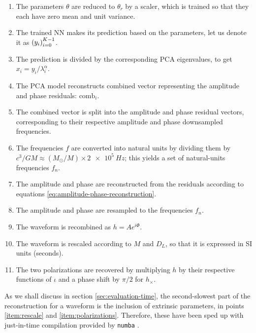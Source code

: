 \documentclass[main.tex]{subfiles}
\begin{document}
\begin{enumerate}
    \item The parameters \(\theta \) are reduced to \(\theta _r\) by a scaler, which is trained so that they each have zero mean and unit variance. \label{item:param-reduction}
    \item The trained \ac{NN} makes its prediction based on the parameters, let us denote it as \(\qty(y_i)_{i=0}^{K-1}\). \label{item:nn-prediction}
    \item The prediction is divided by the corresponding \ac{PCA} eigenvalues, to get \(x_i = y_i / \lambda _i^{\alpha }\).
    \item The \ac{PCA} model reconstructs combined vector representing the amplitude and phase residuals: \(\text{comb}_i\). \label{item:pca-reconstruction}
    \item The combined vector is split into the amplitude and phase residual vectors, corresponding to their respective amplitude and phase downsampled frequencies. \label{item:combined-split}
    \item The frequencies \(f\) are converted into natural units by dividing them by \(c^3 / GM \approx (M_{\odot} / M) \times  \SI{2e5}{Hz}\); this yields a set of natural-units frequencies \(f_n\). \label{item:frequency-conversion}
    \item The amplitude and phase are reconstructed from the residuals according to equations \eqref{eq:amplitude-phase-reconstruction}. \label{item:tf2}
    \item The amplitude and phase are resampled to the frequencies \(f_n\). \label{item:resample}
    \item The waveform is recombined as \(h = A e^{i \Phi }\). \label{item:recombine}
    \item The waveform is rescaled according to \(M\) and \(D_L\), so that it is expressed in \ac{SI} units (seconds). \label{item:rescale}
    \item The two polarizations are recovered by multiplying \(h\) by their respective functions of \(\iota \) and a phase shift by \(\pi /2\) for \(h_ \times \). \label{item:polarizations}
\end{enumerate}

As we shall discuss in section \ref{sec:evaluation-time}, the second-slowest part of the reconstruction for a waveform is the inclusion of extrinsic parameters, in points \ref{item:rescale} and \ref{item:polarizations}. 
Therefore, these have been sped up with just-in-time compilation provided by \texttt{numba} \cite{lamNumbaLLVMbasedPython2015}.
\end{document}
